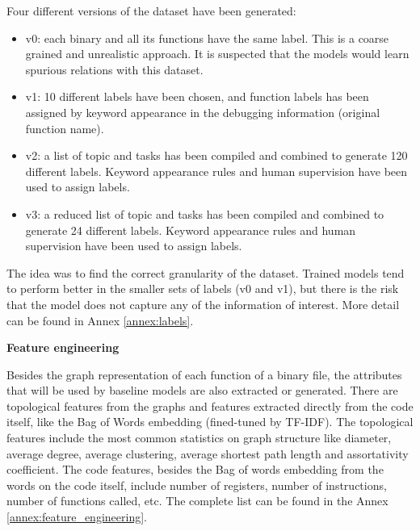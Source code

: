 Four different versions of the dataset have been generated:
\begin{itemize}
	\item v0: each binary and all its functions have the same label. This is a coarse grained and unrealistic approach. It is suspected that the models would learn spurious relations with this dataset.
	\item v1: 10 different labels have been chosen, and function labels has been assigned by keyword appearance in the debugging information (original function name).
	\item v2: a list of topic and tasks has been compiled and combined to generate 120 different labels. Keyword appearance rules and human supervision have been used to assign labels.
	\item v3: a reduced list of topic and tasks has been compiled and combined to generate 24 different labels. Keyword appearance rules and human supervision have been used to assign labels.
\end{itemize}
The idea was to find the correct granularity of the dataset. Trained models tend to perform better in the smaller sets of labels (v0 and v1), but there is the risk that the model does not capture any of the information of interest. More detail can be found in Annex \ref{annex:labels}.





\textbf{Feature engineering}


Besides the graph representation of each function of a binary file, the attributes that will be used by baseline models are also extracted or generated. There are topological features from the graphs and features extracted directly from the code itself, like the Bag of Words embedding (fined-tuned by TF-IDF). The topological features include the most common statistics on graph structure like diameter, average degree, average clustering, average shortest path length and assortativity coefficient. The code features, besides the Bag of words embedding from the words on the code itself, include number of registers, number of instructions, number of functions called, etc. The complete list can be found in the Annex \ref{annex:feature_engineering}.


